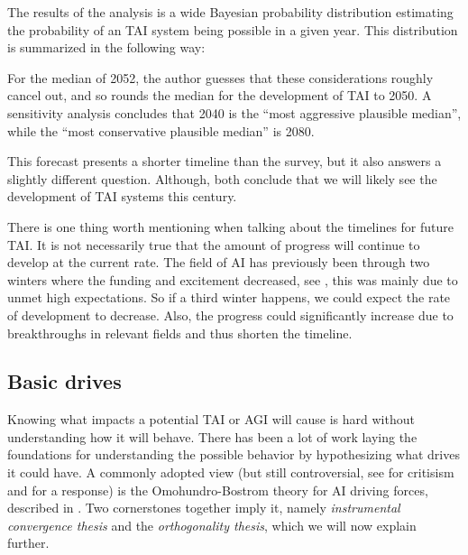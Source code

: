 \documentclass[12pt,A4]{report}
\theoremstyle{definition}
\begin{document}
The results of the analysis is a wide Bayesian probability distribution estimating the probability of an TAI system being possible in a given year. This distribution is summarized in \citet{an121} the following way:
\begin{displayquote}
For the median of 2052, the author guesses that these considerations roughly cancel out, and so rounds the median for the development of TAI to 2050. A sensitivity analysis concludes that 2040 is the “most aggressive plausible median”, while the “most conservative plausible median” is 2080.
\end{displayquote}
This forecast presents a shorter timeline than the survey, but it also answers a slightly different question. Although, both conclude that we will likely see the development of TAI systems this century.  

There is one thing worth mentioning when talking about the timelines for future TAI. It is not necessarily true that the amount of progress will continue to develop at the current rate. The field of AI has previously been through two winters where the funding and excitement decreased, see \citet[p.42]{RusselNorvig}, this was mainly due to unmet high expectations. So if a third winter happens, we could expect the rate of development to decrease. Also, the progress could significantly increase due to breakthroughs in relevant fields and thus shorten the timeline.


\subsection{Basic drives}
Knowing what impacts a potential TAI or AGI will cause is hard without understanding how it will behave. There has been a lot of work laying the foundations for understanding the possible behavior by hypothesizing what drives it could have. A commonly adopted view (but still controversial, see \citet{MullerCannon} for critisism and \citet{Haggstrom21} for a response) is the Omohundro-Bostrom theory for AI driving forces, described in \citet{Haggstrom19}. Two cornerstones together imply it, namely \textit{instrumental convergence thesis} and the \textit{orthogonality thesis}, which we will now explain further.
\end{document}

